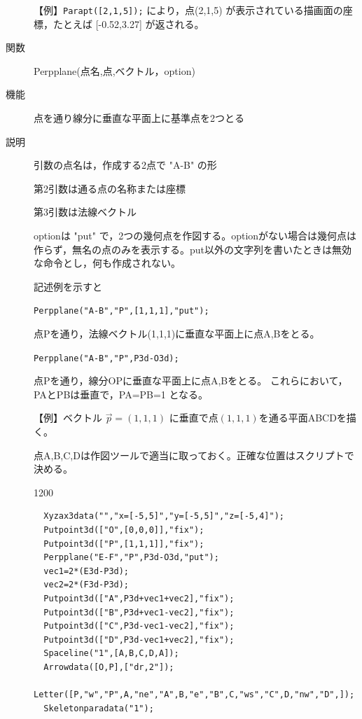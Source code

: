 \documentclass[papersize,a4paper,12pt,uplatex]{jsarticle}
\begin{document}
\begin{description}
\vspace{\baselineskip}
【例】\verb|Parapt([2,1,5]);| により，点(2,1,5) が表示されている描画面の座標，たとえば [-0.52,3.27]  が返される。

\vspace{\baselineskip}
\hypertarget{perpplane}{}
\item[関数]  Perpplane(点名,点,ベクトル，option)
\item[機能]  点を通り線分に垂直な平面上に基準点を2つとる
\item[説明]  引数の点名は，作成する2点で "A-B" の形

第2引数は通る点の名称または座標
  
第3引数は法線ベクトル
  
optionは "put"  で，2つの幾何点を作図する。optionがない場合は幾何点は作らず，無名の点のみを表示する。put以外の文字列を書いたときは無効な命令とし，何も作成されない。
  
記述例を示すと
  
 \verb|Perpplane("A-B","P",[1,1,1],"put");|
    
点Pを通り，法線ベクトル(1,1,1)に垂直な平面上に点A,Bをとる。

 \verb|Perpplane("A-B","P",P3d-O3d);|
 
 点Pを通り，線分OPに垂直な平面上に点A,Bをとる。
 これらにおいて，PAとPBは垂直で，PA=PB=1 となる。
 
\vspace{\baselineskip}
【例】ベクトル $\vec{p}=(1,1,1)$ に垂直で点$(1,1,1)$を通る平面ABCDを描く。

  点A,B,C,Dは作図ツールで適当に取っておく。正確な位置はスクリプトで決める。

\begin{layer}{120}{0}
\end{layer}

\begin{verbatim}
  Xyzax3data("","x=[-5,5]","y=[-5,5]","z=[-5,4]");
  Putpoint3d(["O",[0,0,0]],"fix");
  Putpoint3d(["P",[1,1,1]],"fix");
  Perpplane("E-F","P",P3d-O3d,"put");
  vec1=2*(E3d-P3d);
  vec2=2*(F3d-P3d);
  Putpoint3d(["A",P3d+vec1+vec2],"fix");
  Putpoint3d(["B",P3d+vec1-vec2],"fix");
  Putpoint3d(["C",P3d-vec1-vec2],"fix");
  Putpoint3d(["D",P3d-vec1+vec2],"fix");
  Spaceline("1",[A,B,C,D,A]);
  Arrowdata([O,P],["dr,2"]);
  Letter([P,"w","P",A,"ne","A",B,"e","B",C,"ws","C",D,"nw","D",]);
  Skeletonparadata("1");
\end{verbatim}



\end{description}
\end{document}
